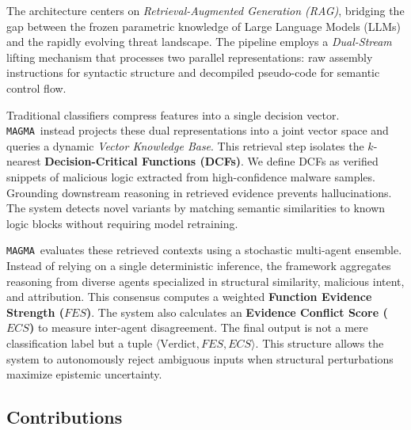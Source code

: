 \documentclass[pdflatex,sn-mathphys-num]{sn-jnl}
\newcommand{\sysname}{\texttt{MAGMA}~}
\begin{document}
The architecture centers on \textit{Retrieval-Augmented Generation (RAG)}, bridging the gap between the frozen parametric knowledge of Large Language Models (LLMs) and the rapidly evolving threat landscape. The pipeline employs a \textit{Dual-Stream} lifting mechanism that processes two parallel representations: raw assembly instructions for syntactic structure and decompiled pseudo-code for semantic control flow.

Traditional classifiers compress features into a single decision vector. \sysname instead projects these dual representations into a joint vector space and queries a dynamic \textit{Vector Knowledge Base}. This retrieval step isolates the $k$-nearest \textbf{Decision-Critical Functions (DCFs)}. We define DCFs as verified snippets of malicious logic extracted from high-confidence malware samples. Grounding downstream reasoning in retrieved evidence prevents hallucinations. The system detects novel variants by matching semantic similarities to known logic blocks without requiring model retraining.

\sysname evaluates these retrieved contexts using a stochastic multi-agent ensemble. Instead of relying on a single deterministic inference, the framework aggregates reasoning from diverse agents specialized in structural similarity, malicious intent, and attribution. This consensus computes a weighted \textbf{Function Evidence Strength ($FES$)}. The system also calculates an \textbf{Evidence Conflict Score ($ECS$)} to measure inter-agent disagreement. The final output is not a mere classification label but a tuple $\langle \text{Verdict}, FES, ECS \rangle$. This structure allows the system to autonomously reject ambiguous inputs when structural perturbations maximize epistemic uncertainty.

\subsection{Contributions}
\label{sec:intro_contributions}
\end{document}
